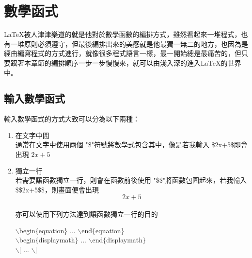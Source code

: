 %
\fontsize{12}{22 pt}\selectfont
\chapter{數學函式}
\LaTeX 被人津津樂道的就是他對於數學函數的編排方式，雖然看起來一堆程式，也有一堆原則必須遵守，但最後編排出來的美感就是他最獨一無二的地方，也因為是經由編寫程式的方式進行，就像很多程式語言一樣，最一開始總是最痛苦的，但只要跟著本章節的編排順序一步一步慢慢來，就可以由淺入深的進入\LaTeX 的世界中。
\section{{輸入數學函式}}
輸入數學函式的方式大致可以分為以下兩種：
\begin{enumerate}
\item 在文字中間\\
通常在文字中使用兩個 "\$"符號將數學式包含其中，像是若我輸入 \$2x+5\$即會出現 $2x+5$
\item 獨立一行\\
若需要讓函數獨立一行，則會在函數前後使用 "\$\$"將函數包圍起來，若我輸入\$\$2x+5\$\$，則畫面便會出現$$2x+5$$\\亦可以使用下列方法達到讓函數獨立一行的目的
\begin{center}
$\backslash$begin$\{$equation$\}$ ... $\backslash$end$\{$equation$\}$\\
$\backslash$begin$\{$displaymath$\}$ ... $\backslash$end$\{$displaymath$\}$\\
$\backslash$[ ... $\backslash$]\\
        \end{center}
\end{enumerate}
